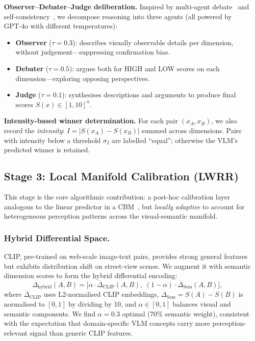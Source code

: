 \documentclass[runningheads]{llncs}
\begin{document}
\smallskip\noindent\textbf{Observer--Debater--Judge deliberation.}
Inspired by multi-agent debate~\cite{du2024improving,liang2024encouraging} and self-consistency~\cite{wang2023selfconsistency}, we decompose reasoning into three agents (all powered by GPT-4o with different temperatures):

\begin{itemize}
\item \textbf{Observer} ($\tau{=}0.3$): describes visually observable details per dimension, without judgement---suppressing confirmation bias.
\item \textbf{Debater} ($\tau{=}0.5$): argues both for HIGH and LOW scores on each dimension---exploring opposing perspectives.
\item \textbf{Judge} ($\tau{=}0.1$): synthesises descriptions and arguments to produce final scores $S(x)\in[1,10]^{n}$.
\end{itemize}

\smallskip\noindent\textbf{Intensity-based winner determination.}
For each pair $(x_A, x_B)$, we also record the \emph{intensity}: $I{=}|S(x_A) - S(x_B)|$ summed across dimensions.
Pairs with intensity below a threshold $\sigma_I$ are labelled ``equal''; otherwise the VLM's predicted winner is retained.

\subsection{Stage 3: Local Manifold Calibration (LWRR)}
\label{sec:stage3}

This stage is the core algorithmic contribution: a post-hoc calibration layer analogous to the linear predictor in a CBM~\cite{koh2020concept}, but \emph{locally adaptive} to account for heterogeneous perception patterns across the visual-semantic manifold.

\subsubsection{Hybrid Differential Space.}

CLIP, pre-trained on web-scale image-text pairs, provides strong general features but exhibits distribution shift on street-view scenes.
We augment it with semantic dimension scores to form the hybrid differential encoding:
\begin{equation}
\Delta_{\text{hybrid}}(A,B)=\bigl[\alpha\cdot\overline{\Delta}_{\text{CLIP}}(A,B),\;(1{-}\alpha)\cdot\overline{\Delta}_{\text{Sem}}(A,B)\bigr],
\label{eq:hybrid_diff}
\end{equation}
where $\overline{\Delta}_{\text{CLIP}}$ uses L2-normalised CLIP embeddings, $\Delta_{\text{Sem}}{=}S(A){-}S(B)$ is normalised to $[0,1]$ by dividing by 10, and $\alpha\in[0,1]$ balances visual and semantic components.
We find $\alpha{=}0.3$ optimal (70\% semantic weight), consistent with the expectation that domain-specific VLM concepts carry more perception-relevant signal than generic CLIP features.
\end{document}
